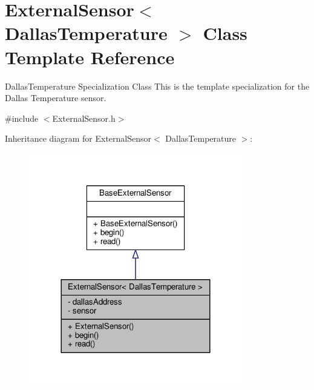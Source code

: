 \hypertarget{classExternalSensor_3_01DallasTemperature_01_4}{}\section{External\+Sensor$<$ Dallas\+Temperature $>$ Class Template Reference}
\label{classExternalSensor_3_01DallasTemperature_01_4}


Dallas\+Temperature Specialization Class This is the template specialization for the Dallas Temperature sensor.  




{\ttfamily \#include $<$External\+Sensor.\+h$>$}



Inheritance diagram for External\+Sensor$<$ Dallas\+Temperature $>$\+:
\nopagebreak
\begin{figure}[H]
\begin{center}
\leavevmode
\includegraphics[width=264pt]{classExternalSensor_3_01DallasTemperature_01_4__inherit__graph}
\end{center}
\end{figure}


